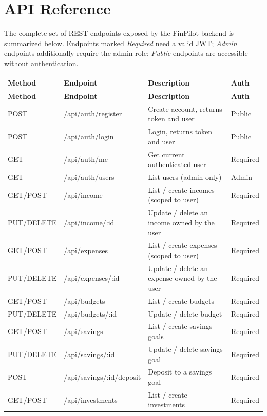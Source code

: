 \documentclass[11pt,a4paper]{report}
\begin{document}
\chapter{API Reference}
The complete set of REST endpoints exposed by the FinPilot backend is summarized
below. Endpoints marked \emph{Required} need a valid JWT; \emph{Admin} endpoints
additionally require the admin role; \emph{Public} endpoints are accessible
without authentication.

\begin{longtable}{l L{4.9cm} L{5.2cm} l}
\toprule
\textbf{Method} & \textbf{Endpoint} & \textbf{Description} & \textbf{Auth} \\
\midrule
\endfirsthead
\toprule
\textbf{Method} & \textbf{Endpoint} & \textbf{Description} & \textbf{Auth} \\
\midrule
\endhead
\bottomrule
\endfoot
POST & /api/auth/register & Create account, returns token and user & Public \\
POST & /api/auth/login & Login, returns token and user & Public \\
GET & /api/auth/me & Get current authenticated user & Required \\
GET & /api/auth/users & List users (admin only) & Admin \\
GET/POST & /api/income & List / create incomes (scoped to user) & Required \\
PUT/DELETE & /api/income/:id & Update / delete an income owned by the user & Required \\
GET/POST & /api/expenses & List / create expenses (scoped to user) & Required \\
PUT/DELETE & /api/expenses/:id & Update / delete an expense owned by the user & Required \\
GET/POST & /api/budgets & List / create budgets & Required \\
PUT/DELETE & /api/budgets/:id & Update / delete budget & Required \\
GET/POST & /api/savings & List / create savings goals & Required \\
PUT/DELETE & /api/savings/:id & Update / delete savings goal & Required \\
POST & /api/savings/:id/deposit & Deposit to a savings goal & Required \\
GET/POST & /api/investments & List / create investments & Required \\

\end{longtable}
\end{document}

